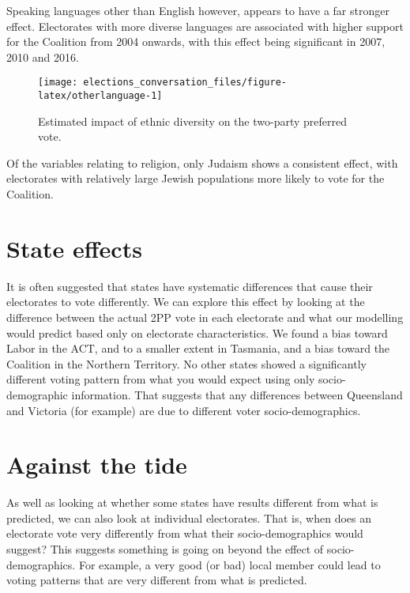 \documentclass[11pt,a4paper,]{article}
\begin{document}
Speaking languages other than English however, appears to have a far stronger effect. Electorates with more diverse languages are associated with higher support for the Coalition from 2004 onwards, with this effect being significant in 2007, 2010 and 2016.

\begin{figure}[H]

{\centering \texttt{[image: elections\_conversation\_files/figure-latex/otherlanguage-1]} 

}

\caption{Estimated impact of ethnic diversity on the two-party preferred vote.}\label{fig:otherlanguage}
\end{figure}

Of the variables relating to religion, only Judaism shows a consistent effect, with electorates with relatively large Jewish populations more likely to vote for the Coalition.

\hypertarget{state-effects}{%
\section{State effects}\label{state-effects}}

It is often suggested that states have systematic differences that cause their electorates to vote differently. We can explore this effect by looking at the difference between the actual 2PP vote in each electorate and what our modelling would predict based only on electorate characteristics. We found a bias toward Labor in the ACT, and to a smaller extent in Tasmania, and a bias toward the Coalition in the Northern Territory. No other states showed a significantly different voting pattern from what you would expect using only socio-demographic information. That suggests that any differences between Queensland and Victoria (for example) are due to different voter socio-demographics.

\hypertarget{against-the-tide}{%
\section{Against the tide}\label{against-the-tide}}

As well as looking at whether some states have results different from what is predicted, we can also look at individual electorates. That is, when does an electorate vote very differently from what their socio-demographics would suggest? This suggests something is going on beyond the effect of socio-demographics. For example, a very good (or bad) local member could lead to voting patterns that are very different from what is predicted.
\end{document}
